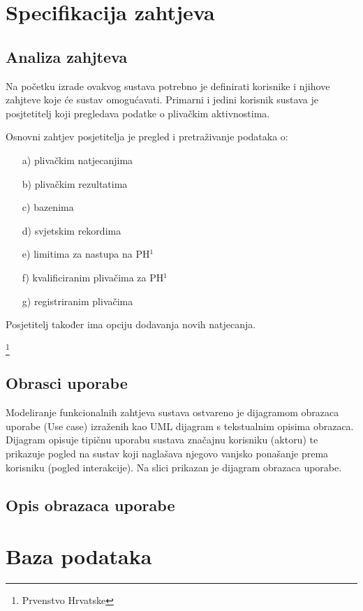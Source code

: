 \documentclass[times, utf8, zavrsni]{fer}
\begin{document}
\chapter{Specifikacija zahtjeva}

\section{Analiza zahjteva}
Na početku izrade ovakvog sustava potrebno je definirati korisnike i njihove zahjteve koje će sustav omogućavati.
Primarni i jedini korisnik sustava je posjtetitelj koji pregledava podatke o plivačkim aktivnostima.

Osnovni zahtjev posjetitelja je pregled i pretraživanje podataka o:
\begin{itemize}
    \item[a)] plivačkim natjecanjima
    \item[b)] plivačkim rezultatima
    \item[c)] bazenima
    \item[d)] svjetskim rekordima
    \item[e)] limitima za nastupa na PH$^1$
    \item[f)] kvalificiranim plivačima za PH$^1$
    \item[g)] registriranim plivačima
\end{itemize}


Posjetitelj također ima opciju dodavanja novih natjecanja.


\footnote{Prvenstvo Hrvatske}

\section{Obrasci uporabe}

Modeliranje funkcionalnih zahtjeva sustava ostvareno je dijagramom obrazaca uporabe (Use case) izraženih kao UML dijagram
s tekstualnim opisima obrazaca. Dijagram opisuje tipičnu uporabu sustava značajnu korisniku (aktoru) te prikazuje pogled na sustav koji naglašava njegovo
vanjsko ponašanje prema korisniku (pogled interakcije). Na slici prikazan je dijagram obrazaca uporabe.

\section{Opis obrazaca uporabe}

\chapter{Baza podataka}
\end{document}
